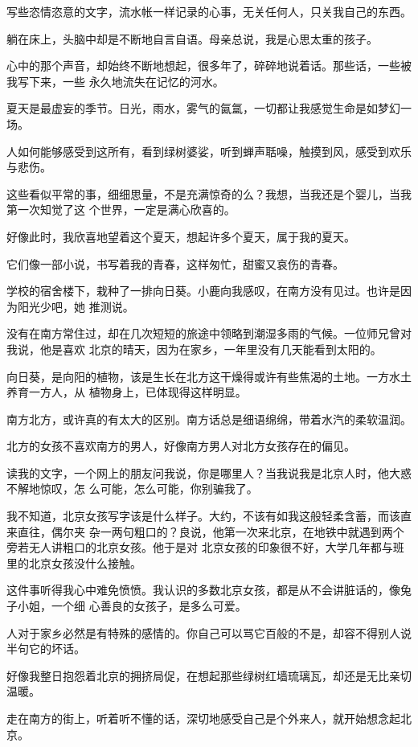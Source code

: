 \documentclass[12pt,a4paper]{article}
\begin{document}
		写些恣情恣意的文字，流水帐一样记录的心事，无关任何人，只关我自己的东西。

		躺在床上，头脑中却是不断地自言自语。母亲总说，我是心思太重的孩子。

		心中的那个声音，却始终不断地想起，很多年了，碎碎地说着话。那些话，一些被我写下来，一些
	永久地流失在记忆的河水。

		夏天是最虚妄的季节。日光，雨水，雾气的氤氲，一切都让我感觉生命是如梦幻一场。

		人如何能够感受到这所有，看到绿树婆娑，听到蝉声聒噪，触摸到风，感受到欢乐与悲伤。

		这些看似平常的事，细细思量，不是充满惊奇的么？我想，当我还是个婴儿，当我第一次知觉了这
	个世界，一定是满心欣喜的。

		好像此时，我欣喜地望着这个夏天，想起许多个夏天，属于我的夏天。

		它们像一部小说，书写着我的青春，这样匆忙，甜蜜又哀伤的青春。

		学校的宿舍楼下，栽种了一排向日葵。小鹿向我感叹，在南方没有见过。也许是因为阳光少吧，她
	推测说。

		没有在南方常住过，却在几次短短的旅途中领略到潮湿多雨的气候。一位师兄曾对我说，他是喜欢
	北京的晴天，因为在家乡，一年里没有几天能看到太阳的。

		向日葵，是向阳的植物，该是生长在北方这干燥得或许有些焦渴的土地。一方水土养育一方人，从
	植物身上，已体现得这样明显。

		南方北方，或许真的有太大的区别。南方话总是细语绵绵，带着水汽的柔软温润。

		北方的女孩不喜欢南方的男人，好像南方男人对北方女孩存在的偏见。

		读我的文字，一个网上的朋友问我说，你是哪里人？当我说我是北京人时，他大惑不解地惊叹，怎
	么可能，怎么可能，你别骗我了。

		我不知道，北京女孩写字该是什么样子。大约，不该有如我这般轻柔含蓄，而该直来直往，偶尔夹
	杂一两句粗口的？良说，他第一次来北京，在地铁中就遇到两个旁若无人讲粗口的北京女孩。他于是对
	北京女孩的印象很不好，大学几年都与班里的北京女孩没什么接触。

		这件事听得我心中难免愤愤。我认识的多数北京女孩，都是从不会讲脏话的，像兔子小姐，一个细
	心善良的女孩子，是多么可爱。

		人对于家乡必然是有特殊的感情的。你自己可以骂它百般的不是，却容不得别人说半句它的坏话。

		好像我整日抱怨着北京的拥挤局促，在想起那些绿树红墙琉璃瓦，却还是无比亲切温暖。

		走在南方的街上，听着听不懂的话，深切地感受自己是个外来人，就开始想念起北京。
\end{document}
